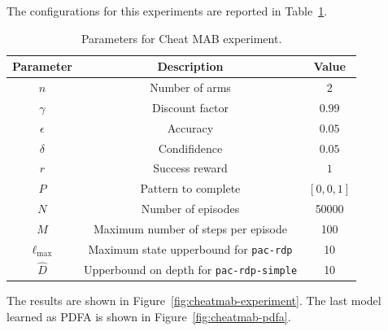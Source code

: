 \documentclass{article}
\begin{document}
The configurations for this experiments are reported in
Table~\ref{tab:cheatmab-params}.

\begin{table}[!h]
\centering
    \begin{tabular}{|c|c|c|}
 \hline
 Parameter & Description & Value \\ \hline \hline
 $n$ & Number of arms & $2$\\ \hline
 $\gamma$ & Discount factor & $0.99$\\ \hline
 $\epsilon$ & Accuracy & $0.05$\\ \hline
 $\delta$ & Condifidence & $0.05$\\ \hline
 $r$ & Success reward & $1$\\ \hline
 $P$ & Pattern to complete & $[0, 0, 1]$\\ \hline
 $N$ & Number of episodes & 50000 \\ \hline
 $M$ & Maximum number of steps per episode & 100 \\ \hline
 $\ell_{\max}$ & Maximum state upperbound for \texttt{pac-rdp} & 10 \\ \hline
 $\hat{D}$ & Upperbound on depth for \texttt{pac-rdp-simple} & 10 \\ \hline
\end{tabular}
\caption{Parameters for Cheat MAB experiment.}
\label{tab:cheatmab-params}
\end{table}

The results are shown in Figure~\ref{fig:cheatmab-experiment}.
The last model learned as PDFA is shown in Figure~\ref{fig:cheatmab-pdfa}.
\end{document}
